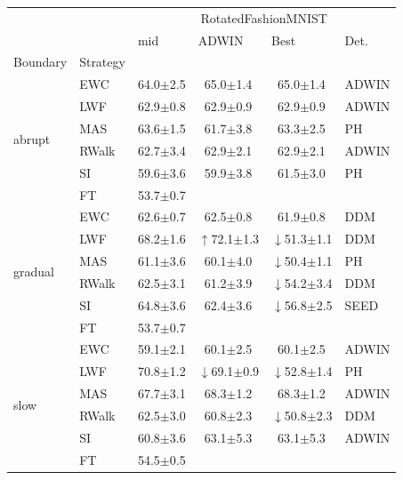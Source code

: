 \begin{tabular}{llllll}
\toprule
 &  & \multicolumn{4}{c}{RotatedFashionMNIST} \\
 &  & mid & ADWIN & Best & Det. \\
Boundary & Strategy &  &  &  &  \\
\midrule
\multirow[t]{6}{*}{abrupt} & EWC & 64.0\tiny{$\pm$2.5} & $\ \;$65.0\tiny{$\pm$1.4} & $\ \;$65.0\tiny{$\pm$1.4} & ADWIN \\
 & LWF & 62.9\tiny{$\pm$0.8} & $\ \;$62.9\tiny{$\pm$0.9} & $\ \;$62.9\tiny{$\pm$0.9} & ADWIN \\
 & MAS & 63.6\tiny{$\pm$1.5} & $\ \;$61.7\tiny{$\pm$3.8} & $\ \;$63.3\tiny{$\pm$2.5} & PH \\
 & RWalk & 62.7\tiny{$\pm$3.4} & $\ \;$62.9\tiny{$\pm$2.1} & $\ \;$62.9\tiny{$\pm$2.1} & ADWIN \\
 & SI & 59.6\tiny{$\pm$3.6} & $\ \;$59.9\tiny{$\pm$3.8} & $\ \;$61.5\tiny{$\pm$3.0} & PH \\
 & FT & 53.7\tiny{$\pm$0.7} &  &  &  \\
\midrule
\multirow[t]{6}{*}{gradual} & EWC & 62.6\tiny{$\pm$0.7} & $\ \;$62.5\tiny{$\pm$0.8} & $\ \;$61.9\tiny{$\pm$0.8} & DDM \\
 & LWF & 68.2\tiny{$\pm$1.6} & $\uparrow$72.1\tiny{$\pm$1.3} & $\downarrow$51.3\tiny{$\pm$1.1} & DDM \\
 & MAS & 61.1\tiny{$\pm$3.6} & $\ \;$60.1\tiny{$\pm$4.0} & $\downarrow$50.4\tiny{$\pm$1.1} & PH \\
 & RWalk & 62.5\tiny{$\pm$3.1} & $\ \;$61.2\tiny{$\pm$3.9} & $\downarrow$54.2\tiny{$\pm$3.4} & DDM \\
 & SI & 64.8\tiny{$\pm$3.6} & $\ \;$62.4\tiny{$\pm$3.6} & $\downarrow$56.8\tiny{$\pm$2.5} & SEED \\
 & FT & 53.7\tiny{$\pm$0.7} &  &  &  \\
\midrule
\multirow[t]{6}{*}{slow} & EWC & 59.1\tiny{$\pm$2.1} & $\ \;$60.1\tiny{$\pm$2.5} & $\ \;$60.1\tiny{$\pm$2.5} & ADWIN \\
 & LWF & 70.8\tiny{$\pm$1.2} & $\downarrow$69.1\tiny{$\pm$0.9} & $\downarrow$52.8\tiny{$\pm$1.4} & PH \\
 & MAS & 67.7\tiny{$\pm$3.1} & $\ \;$68.3\tiny{$\pm$1.2} & $\ \;$68.3\tiny{$\pm$1.2} & ADWIN \\
 & RWalk & 62.5\tiny{$\pm$3.0} & $\ \;$60.8\tiny{$\pm$2.3} & $\downarrow$50.8\tiny{$\pm$2.3} & DDM \\
 & SI & 60.8\tiny{$\pm$3.6} & $\ \;$63.1\tiny{$\pm$5.3} & $\ \;$63.1\tiny{$\pm$5.3} & ADWIN \\
 & FT & 54.5\tiny{$\pm$0.5} &  &  &  \\
\bottomrule
\end{tabular}
